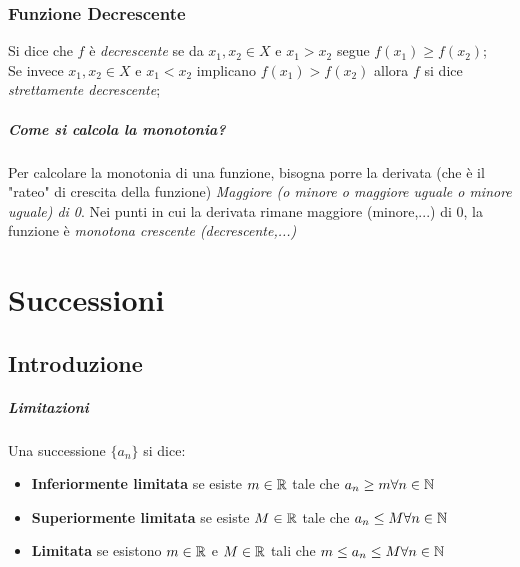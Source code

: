 \documentclass[12pt, a4paper, openany]{book}
\begin{document}
\subsection*{Funzione Decrescente}
Si dice che $f$ è \emph{decrescente} se da $x_1, x_2 \in X$ e $x_1 > x_2$ segue $f(x_1) \geq f(x_2)$;
\\Se invece $x_1, x_2 \in X$ e $x_1 < x_2$ implicano $f(x_1) > f(x_2)$ allora $f$ si dice \emph{strettamente decrescente};

\paragraph{Come si calcola la monotonia?}
Per calcolare la monotonia di una funzione, bisogna porre la derivata (che è il "rateo" di crescita della funzione) \emph{Maggiore (o minore o maggiore uguale o minore uguale) di 0}.
Nei punti in cui la derivata rimane maggiore (minore,...) di 0, la funzione è \emph{monotona crescente (decrescente,...)}

\chapter{Successioni}

\section{Introduzione}

\paragraph*{Limitazioni} Una successione $\{a_n\}$ si dice:
\begin{itemize}
	\item \textbf{Inferiormente limitata} se esiste $m \in \mathbb{R}$ tale che $a_n \geq m \forall n \in \mathbb{N}$
	\item \textbf{Superiormente limitata} se esiste $M \in \mathbb{R}$ tale che $a_n \leq M \forall n \in \mathbb{N}$
	\item \textbf{Limitata} se esistono $m \in \mathbb{R}$ e $M \in \mathbb{R}$ tali che $m \leq a_n \leq M \forall n \in \mathbb{N}$
\end{itemize}
\end{document}
